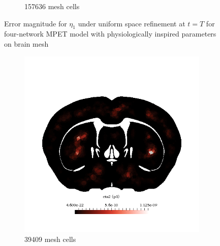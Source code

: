 \begin{figure}[h!]
\begin{subfigure}[b]{0.49\textwidth}
    \caption{157636 mesh cells}
  \end{subfigure}
  \caption{Error magnitude for $\eta_1$ under uniform space refinement at $t=T$ for four-network MPET model with physiologically inspired parameters on brain mesh} \label{fig:mpet4_eta1}
\end{figure}


\begin{figure}[h!]
  \centering
  \begin{subfigure}[b]{0.49\textwidth}
    \includegraphics[width=\textwidth,height=\textheight,keepaspectratio,height=\textheight,keepaspectratio]{figures/4_mpet/biomedical/space/eta2_p1_1.png}
    \caption{39409 mesh cells}
  \end{subfigure}
  \begin{subfigure}[b]{0.49\textwidth}

\end{subfigure}
\end{figure}
